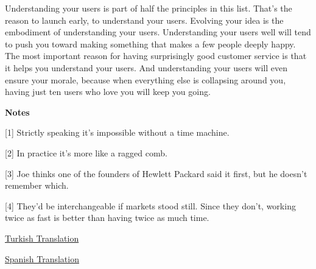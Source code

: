 Understanding
                    your users is part of half the principles in this list.
                    That's the reason to launch early, to understand your users.
                    Evolving your idea is the embodiment of understanding your
                    users. Understanding your users well will tend to push you
                    toward making something that makes a few people deeply
                    happy. The most important reason for having surprisingly
                    good customer service is that it helps you understand your
                    users. And understanding your users will even ensure your
                    morale, because when everything else is collapsing around
                    you, having just ten users who love you will keep you
                    going.





\textbf{Notes}

[1] Strictly speaking it's impossible without a time
                    machine.

[2] In practice it's more like a ragged comb.

[3] Joe thinks one of the founders of Hewlett Packard said it
                    first, but he doesn't remember which.

[4] They'd be interchangeable if markets stood still. Since
                    they don't, working twice as fast is better than having
                    twice as much time.



              
            
          
          

          
            
              
            
            
              
                \href{http://blog.tayfunsen.com/2009/05/13-cumlede-startuplar.html}{Turkish Translation}

              
              
              
                \href{http://www.recursosparapymes.com/las-13-cosas-que-paul-graham-le-diria-a-un-emprendedor/}{Spanish Translation}

              
            
            
              
            
            
              
            
